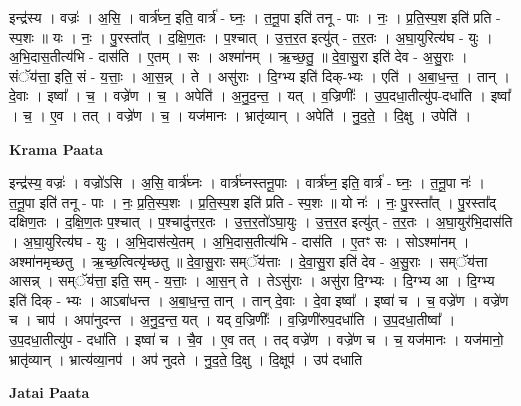 \documentclass[17pt]{extarticle}
\begin{document}
इन्द्र॑स्य । वज्रः॑ । अ॒सि॒ । वार्त्र॑घ्न॒ इति॒ वार्त्र॑ - घ्नः॒ । त॒नू॒पा इति॑ तनू - पाः । नः॒ । प्र॒ति॒स्प॒श इति॑ प्रति - स्प॒शः ॥ यः । नः॒ । पु॒रस्ता᳚त् । द॒क्षि॒ण॒तः । प॒श्चात् । उ॒त्त॒र॒त इत्यु॑त् - त॒र॒तः । अ॒घा॒युरित्य॑घ - युः । अ॒भि॒दास॒तीत्य॑भि - दास॑ति । ए॒तम् । सः । अश्मा॑नम् । ऋ॒च्छ॒तु॒ ॥ दे॒वा॒सु॒रा इति॑ देव - अ॒सु॒राः । संॅय॑त्ता॒ इति॒ सं - य॒त्ताः॒ । आ॒स॒न्न् । ते । असु॑राः । दि॒ग्भ्य इति॑ दिक्-भ्यः । एति॑ । अ॒बा॒ध॒न्त॒ । तान् । दे॒वाः । इष्वा᳚ । च॒ । वज्रे॑ण । च॒ । अपेति॑ । अ॒नु॒द॒न्त॒ । यत् । व॒ज्रिणीः᳚ । उ॒प॒दधा॒तीत्यु॑प-दधा॑ति । इष्वा᳚ । च॒ । ए॒व । तत् । वज्रे॑ण । च॒ । यज॑मानः । भ्रातृ॑व्यान् । अपेति॑ । नु॒द॒ते॒ । दि॒क्षु । उपेति॑ ।  \newline


\textbf{Krama Paata} \newline

इन्द्र॑स्य॒ वज्रः॑ । वज्रो॑ऽसि । अ॒सि॒ वार्त्र॑घ्नः । वार्त्र॑घ्नस्तनू॒पाः । वार्त्र॑घ्न॒ इति॒ वार्त्र॑ - घ्नः॒ । त॒नू॒पा नः॑ । त॒नू॒पा इति॑ तनू - पाः । नः॒ प्र॒ति॒स्प॒शः । प्र॒ति॒स्प॒श इति॑ प्रति - स्प॒शः ॥ यो नः॑ । नः॒ पु॒रस्ता᳚त् । पु॒रस्ता᳚द् दक्षिण॒तः । द॒क्षि॒ण॒तः प॒श्चात् । प॒श्चादु॑त्तर॒तः । उ॒त्त॒र॒तो॑ऽघा॒युः । उ॒त्त॒र॒त इत्यु॑त् - त॒र॒तः । अ॒घा॒युर॑भि॒दास॑ति । अ॒घा॒युरित्य॑घ - युः । अ॒भि॒दास॑त्ये॒तम् । अ॒भि॒दास॒तीत्य॑भि - दास॑ति । ए॒तꣳ सः । सोऽश्मा॑नम् । अश्मा॑नमृच्छतु । ऋ॒च्छ॒त्वित्यृ॑च्छतु ॥ दे॒वा॒सु॒राः सम्ॅय॑त्ताः । दे॒वा॒सु॒रा इति॑ देव - अ॒सु॒राः । सम्ॅय॑त्ता आसन्न् । सम्ॅय॑त्ता॒ इति॒ सम् - य॒त्ताः॒ । आ॒स॒न् ते । तेऽसु॑राः । असु॑रा दि॒ग्भ्यः । दि॒ग्भ्य आ । दि॒ग्भ्य इति॑ दिक् - भ्यः । आऽबा॑धन्त । अ॒बा॒ध॒न्त॒ तान् । तान् दे॒वाः । दे॒वा इष्वा᳚ । इष्वा॑ च । च॒ वज्रे॑ण । वज्रे॑ण च । चाप॑ । अपा॑नुदन्त । अ॒नु॒द॒न्त॒ यत् । यद् व॒ज्रिणीः᳚ । व॒ज्रिणी॑रुप॒दधा॑ति । उ॒प॒दधा॒तीष्वा᳚ । उ॒प॒दधा॒तीत्यु॑प - दधा॑ति । इष्वा॑ च । चै॒व । ए॒व तत् । तद् वज्रे॑ण । वज्रे॑ण च । च॒ यज॑मानः । यज॑मानो॒ भ्रातृ॑व्यान् । भ्रात्य॑व्या॒नप॑ । अप॑ नुदते । नु॒द॒ते॒ दि॒क्षु । दि॒क्षूप॑ । उप॑ दधाति \newline

\textbf{Jatai Paata} \newline
\end{document}
